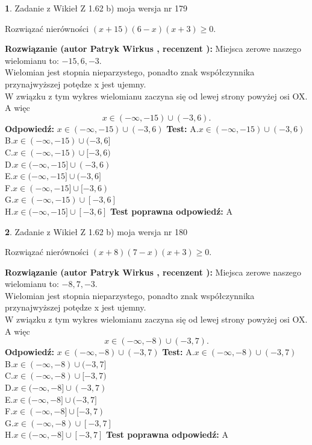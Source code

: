 \documentclass[12pt, a4paper]{article}
\theoremstyle{definition} %
\newtheorem{zad}{}
\newcommand{\zadStart}[1]{\begin{zad}#1\newline}
\newcommand{\zadStop}{\end{zad}}
\newcommand{\rozwStart}[2]{\noindent \textbf{Rozwiązanie (autor #1 , recenzent #2): }\newline}
\newcommand{\rozwStop}{\newline}
\newcommand{\odpStart}{\noindent \textbf{Odpowiedź:}\newline}
\newcommand{\odpStop}{\newline}
\newcommand{\testStart}{\noindent \textbf{Test:}\newline}
\newcommand{\testStop}{\newline}
\newcommand{\kluczStart}{\noindent \textbf{Test poprawna odpowiedź:}\newline}
\newcommand{\kluczStop}{\newline}
\begin{document}
\zadStart{Zadanie z Wikieł Z 1.62 b) moja wersja nr 179}

Rozwiązać nierówności $(x+15)(6-x)(x+3)\ge0$.
\zadStop
\rozwStart{Patryk Wirkus}{}
Miejsca zerowe naszego wielomianu to: $-15, 6, -3$.\\
Wielomian jest stopnia nieparzystego, ponadto znak współczynnika przy\linebreak najwyższej potędze x jest ujemny.\\ W związku z tym wykres wielomianu zaczyna się od lewej strony powyżej osi OX. A więc $$x \in (-\infty,-15) \cup (-3,6).$$
\rozwStop
\odpStart
$x \in (-\infty,-15) \cup (-3,6)$
\odpStop
\testStart
A.$x \in (-\infty,-15) \cup (-3,6)$\\
B.$x \in (-\infty,-15) \cup (-3,6]$\\
C.$x \in (-\infty,-15) \cup [-3,6)$\\
D.$x \in (-\infty,-15] \cup (-3,6)$\\
E.$x \in (-\infty,-15] \cup (-3,6]$\\
F.$x \in (-\infty,-15] \cup [-3,6)$\\
G.$x \in (-\infty,-15) \cup [-3,6]$\\
H.$x \in (-\infty,-15] \cup [-3,6]$
\testStop
\kluczStart
A
\kluczStop



\zadStart{Zadanie z Wikieł Z 1.62 b) moja wersja nr 180}

Rozwiązać nierówności $(x+8)(7-x)(x+3)\ge0$.
\zadStop
\rozwStart{Patryk Wirkus}{}
Miejsca zerowe naszego wielomianu to: $-8, 7, -3$.\\
Wielomian jest stopnia nieparzystego, ponadto znak współczynnika przy\linebreak najwyższej potędze x jest ujemny.\\ W związku z tym wykres wielomianu zaczyna się od lewej strony powyżej osi OX. A więc $$x \in (-\infty,-8) \cup (-3,7).$$
\rozwStop
\odpStart
$x \in (-\infty,-8) \cup (-3,7)$
\odpStop
\testStart
A.$x \in (-\infty,-8) \cup (-3,7)$\\
B.$x \in (-\infty,-8) \cup (-3,7]$\\
C.$x \in (-\infty,-8) \cup [-3,7)$\\
D.$x \in (-\infty,-8] \cup (-3,7)$\\
E.$x \in (-\infty,-8] \cup (-3,7]$\\
F.$x \in (-\infty,-8] \cup [-3,7)$\\
G.$x \in (-\infty,-8) \cup [-3,7]$\\
H.$x \in (-\infty,-8] \cup [-3,7]$
\testStop
\kluczStart
A
\kluczStop
\end{document}

